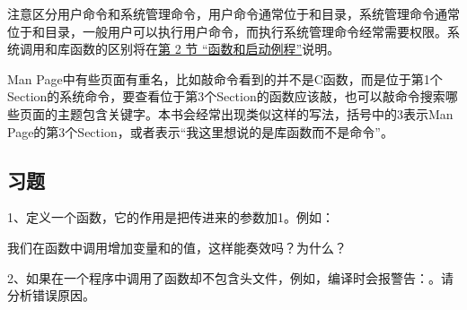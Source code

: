 \begin{BookNote}
注意区分用户命令和系统管理命令，用户命令通常位于和目录，系统管理命令通常位于和目录，一般用户可以执行用户命令，而执行系统管理命令经常需要权限。系统调用和库函数的区别将在\hyperlink{db.ch19s02.id2776173}{第 2 节 “函数和启动例程”}说明。



Man Page中有些页面有重名，比如敲命令看到的并不是C函数，而是位于第1个Section的系统命令，要查看位于第3个Section的函数应该敲，也可以敲命令搜索哪些页面的主题包含关键字。本书会经常出现类似这样的写法，括号中的3表示Man Page的第3个Section，或者表示“我这里想说的是库函数而不是命令”。

\end{BookNote}

\subsection*{习题}
%


1、定义一个函数，它的作用是把传进来的参数加1。例如：




我们在函数中调用增加变量和的值，这样能奏效吗？为什么？



2、如果在一个程序中调用了函数却不包含头文件，例如，编译时会报警告：。请分析错误原因。




